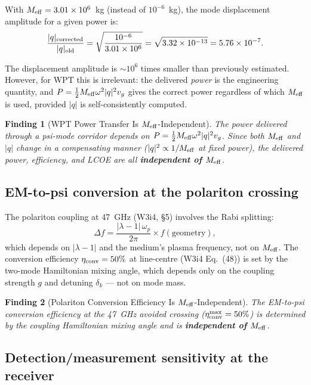 \documentclass[11pt]{article}
\newtheorem{finding}{Finding}
\newcommand{\ee}[1]{\times 10^{#1}}
\newcommand{\Meff}{M_{\rm eff}}
\newcommand{\lambdaone}{|\lambda{-}1|}
\begin{document}
With $\Meff = 3.01\ee{6}$~kg (instead of $10^{-6}$~kg), the mode displacement
amplitude for a given power is:
\begin{equation}
\frac{|q|_{\rm corrected}}{|q|_{\rm old}} = \sqrt{\frac{10^{-6}}{3.01\ee{6}}}
= \sqrt{3.32\ee{-13}} = 5.76\ee{-7}.
\label{eq:q-ratio}
\end{equation}

The displacement amplitude is $\sim 10^6$ times smaller than previously estimated.
However, for WPT this is irrelevant: the delivered \emph{power} is the engineering
quantity, and $P = \frac{1}{2}\Meff\omega^2|q|^2 v_g$ gives the correct power
regardless of which $\Meff$ is used, provided $|q|$ is self-consistently computed.

\begin{finding}[WPT Power Transfer Is $\Meff$-Independent]
\label{find:WPT-power-Meff}
The power delivered through a psi-mode corridor depends on $P =
\frac{1}{2}\Meff\omega^2|q|^2 v_g$. Since both $\Meff$ and $|q|$ change
in a compensating manner ($|q|^2 \propto 1/\Meff$ at fixed power), the
delivered power, efficiency, and LCOE are all \textbf{independent of $\Meff$}.
\end{finding}

\subsection{EM-to-psi conversion at the polariton crossing}

The polariton coupling at 47~GHz (W3i4, \S5) involves the Rabi splitting:
\begin{equation}
\Delta f = \frac{\lambdaone\,\omega_p}{2\pi} \times f(\text{geometry}),
\label{eq:Rabi-general}
\end{equation}
which depends on $\lambdaone$ and the medium's plasma frequency, not on $\Meff$.
The conversion efficiency $\eta_{\rm conv} = 50\%$ at line-centre (W3i4 Eq.~(48))
is set by the two-mode Hamiltonian mixing angle, which depends only on the
coupling strength $g$ and detuning $\delta_k$ --- not on mode mass.

\begin{finding}[Polariton Conversion Efficiency Is $\Meff$-Independent]
\label{find:polariton-Meff}
The EM-to-psi conversion efficiency at the 47~GHz avoided crossing
($\eta_{\rm conv}^{\rm max} = 50\%$) is determined by the coupling Hamiltonian
mixing angle and is \textbf{independent of $\Meff$}.
\end{finding}

\subsection{Detection/measurement sensitivity at the receiver}
\end{document}
